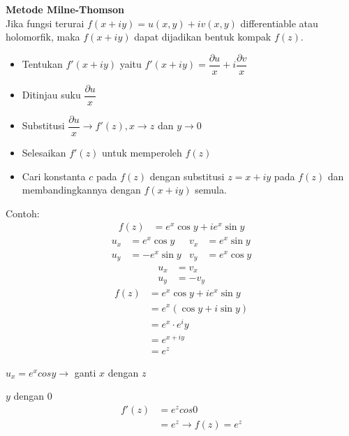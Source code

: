 \documentclass{article}
\begin{document}
\newpage
\textbf{Metode Milne-Thomson}
\leavevmode\\

Jika fungsi terurai $f(x+iy)=u(x,y) + iv(x,y)$  differentiable atau holomorfik, maka $f(x+iy)$ dapat dijadikan bentuk kompak $f(z)$.

\begin{itemize}
    \item Tentukan $f'(x+iy)$ yaitu $f'(x+iy) = \dfrac{\partial u}{x} + i \dfrac{\partial v}{x}$
    \item Ditinjau suku $\dfrac{\partial u}{x}$
    \item Substitusi $\dfrac{\partial u}{x} \rightarrow  f'(z), x \rightarrow z$ dan $y \rightarrow 0$
    \item Selesaikan $f'(z)$ untuk memperoleh $f(z)$
    \item Cari konstanta $c$ pada $f(z)$ dengan substitusi $z = x +iy$ pada $f(z)$ dan membandingkannya dengan $f(x+iy)$ semula.
\end{itemize}

Contoh:
\begin{align}
    f(z) & = e^x \cos y + i e^x \sin y
    \nonumber
\end{align}
\begin{align}
    u_x & = e^x \cos y  & v_x & = e^x \sin y
    \nonumber                                \\
    u_y & = -e^x \sin y & v_y & = e^x \cos y
    \nonumber
\end{align}
\begin{align}
    u_x & = v_x
    \nonumber    \\
    u_y & = -v_y
    \nonumber
\end{align}
\begin{align}
    f(z) & = e^x \cos y + i e^x \sin y
    \nonumber                          \\
         & = e^x (\cos y + i \sin y)
    \nonumber                          \\
         & = e^x \cdot e^iy
    \nonumber                          \\
         & = e^{x+iy}
    \nonumber                          \\
         & = e^z
    \nonumber\
\end{align}

$u_x  = e^x cos y \rightarrow$ ganti $x$ dengan $z$

$y$ dengan $0$
\begin{align}
    f'(z) & = e^z cos 0
    \nonumber                            \\
          & = e^z \rightarrow f(z) = e^z
    \nonumber
\end{align}
\end{document}
